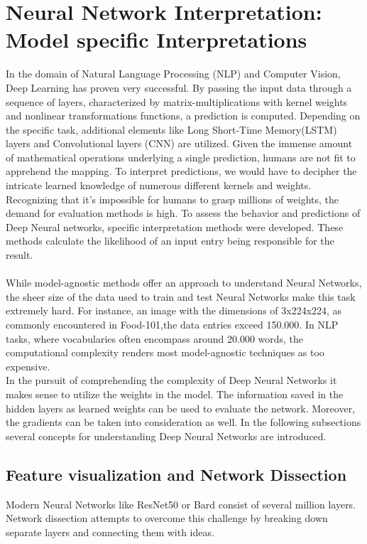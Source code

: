\section{Neural Network Interpretation: Model specific Interpretations}
\label{sec:nni}
In the domain of Natural Language Processing (NLP) and Computer Vision, Deep Learning has proven very successful. By passing the input data through a sequence of layers, characterized by matrix-multiplications with kernel weights and nonlinear transformations functions, a prediction is computed. Depending on the specific task, additional elements like Long Short-Time Memory(LSTM) layers and Convolutional layers (CNN) are utilized. Given the immense amount of mathematical operations underlying a single prediction, humans are not fit to apprehend the mapping. To interpret predictions, we would have to decipher the intricate learned knowledge of numerous different kernels and weights.
Recognizing that it's impossible for humans to grasp millions of weights, the demand for evaluation methods is high. To assess the behavior and predictions of Deep Neural networks, specific interpretation methods were developed. These methods calculate the likelihood of an input entry being responsible for the result.
\\\\
While model-agnostic methods offer an approach to understand Neural Networks, the sheer size of the data used to train and test Neural Networks make this task extremely hard. For instance, an image with the dimensions of 3x224x224, as commonly encountered in Food-101,the data entries exceed 150.000. In NLP tasks, where vocabularies often encompass around 20.000 words, the computational complexity renders most model-agnostic techniques as too expensive.
\\
In the pursuit of comprehending the complexity of Deep Neural Networks it makes sense to utilize the  weights in the model. The information saved in the hidden layers  as learned weights can be used to evaluate the network. Moreover, the gradients can be taken into consideration as well.
In the following subsections several concepts for understanding Deep Neural Networks are introduced. 


\subsection{Feature visualization and Network Dissection \cite{olah2017feature} }
\label{sec:network_dissection}
Modern Neural Networks like ResNet50 or Bard consist of several million layers. Network dissection attempts to overcome this challenge by breaking down separate layers and connecting them with ideas. 

